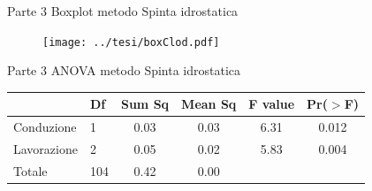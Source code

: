 \documentclass[10pt]{beamer}
\begin{document}
\begin{frame}{Parte 3 \small{Boxplot metodo Spinta idrostatica}} 
  \begin{figure}
    \texttt{[image: ../tesi/boxClod.pdf]}
  \end{figure}
\end{frame}


\begin{frame}{Parte 3 \small{ ANOVA metodo Spinta idrostatica}}
  \begin{table}
    \centering
    \begin{tabular}{llcccc}
      \hline
      & Df  & Sum Sq & Mean Sq & F value & Pr($>$F) \\ 
      \hline
      Conduzione  & 1   & 0.03   & 0.03    & 6.31    & 0.012    \\ 
      Lavorazione & 2   & 0.05   & 0.02    & 5.83    & 0.004    \\ 
      Totale      & 104 & 0.42   & 0.00    &         &          \\ 
      \hline
    \end{tabular}
    \label{tab:Anova densita per spinta}
  \end{table}
\end{frame}




\end{document}
